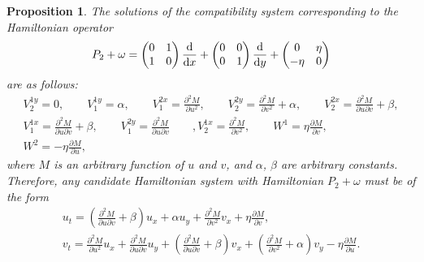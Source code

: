 \documentclass[pdftex]{sigma}
\numberwithin{equation}{section}
\newtheorem{Proposition}[Theorem]{Proposition}
 { \theoremstyle{definition}
\newtheorem{Definition}[Theorem]{Definition}
\newtheorem{Note}[Theorem]{Note}
\newtheorem{Example}[Theorem]{Example}
\newtheorem{Remark}[Theorem]{Remark} }
\begin{document}
\begin{Proposition}\label{proposition4.3}
The solutions of the compatibility system corresponding to the Hamiltonian operator
\begin{gather*}
P_2+\omega=\begin{pmatrix} 0&1\\1&0\\ \end{pmatrix} \frac{\rm d}{{\rm d}x}+ \begin{pmatrix} 0&0\\0&1\\ \end{pmatrix} \frac{\rm d}{{\rm d}y}+\begin{pmatrix} 0&\eta\\-\eta&0\\ \end{pmatrix}
\end{gather*}
are as follows:
\begin{gather*}
 V^{1y}_2=0, \qquad V^{1y}_1=\alpha ,
 \qquad V^{2x}_1=\frac{\partial^2M}{\partial u^2} ,\qquad
 V^{2y}_2=\frac{\partial^2M}{\partial v^2}+\alpha, \qquad
 V^{2x}_2=\frac{\partial^2M}{\partial u \partial v}+\beta,\\ V^{1x}_1=\frac{\partial^2M}{\partial u \partial v}+\beta,\qquad
 V^{2y}_1=\frac{\partial^2M}{\partial u \partial v} \qquad, V^{1x}_2=\frac{\partial^2M}{\partial v^2}, \qquad
 W^1=\eta\frac{\partial M}{\partial v} ,
\\ W^2=-\eta\frac{\partial M}{\partial u} ,
\end{gather*}
where $M$ is an arbitrary function of $u$ and $v$, and $\alpha$, $\beta$ are arbitrary constants. Therefore, any candidate Hamiltonian system with Hamiltonian $P_2+\omega$ must be of the form
\begin{gather}
u_t=\left(\frac{\partial^2 M}{\partial u\partial v}+\beta\right)u_x+\alpha u_y+\frac{\partial^2 M}{\partial v^2}v_x+\eta\frac{\partial M}{\partial v},\nonumber\\
v_t=\frac{\partial^2 M}{\partial u^2}u_x+\frac{\partial^2 M}{\partial u\partial v}u_y+\left(\frac{\partial^2 M}{\partial u\partial v}+\beta\right)v_x+\left(\frac{\partial^2 M}{\partial v^2}+\alpha\right)v_y-\eta\frac{\partial M}{\partial u}.\label{eq:solcomp2}
\end{gather}
\end{Proposition}
\end{document}
